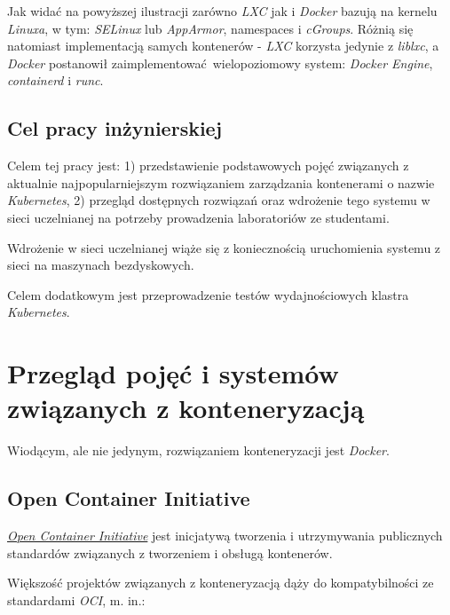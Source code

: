 \documentclass[a4paper,12pt,twoside,openany]{report}
\begin{document}
Jak widać na powyższej ilustracji zarówno \emph{LXC} jak i \emph{Docker}
bazują na kernelu \emph{Linuxa}, w tym: \emph{SELinux} lub
\emph{AppArmor}, namespaces i \emph{cGroups}. Różnią się natomiast
implementacją samych kontenerów - \emph{LXC} korzysta jedynie z
\emph{liblxc}, a \emph{Docker} postanowił zaimplementować~wielopoziomowy
system: \emph{Docker Engine}, \emph{containerd} i \emph{runc}.

\hypertarget{cel-pracy-inux17cynierskiej}{%
\section{Cel pracy inżynierskiej}\label{cel-pracy-inux17cynierskiej}}

Celem tej pracy jest: 1) przedstawienie podstawowych pojęć związanych z
aktualnie najpopularniejszym rozwiązaniem zarządzania kontenerami o
nazwie \emph{Kubernetes}, 2) przegląd dostępnych rozwiązań oraz
wdrożenie tego systemu w sieci uczelnianej na potrzeby prowadzenia
laboratoriów ze studentami.

Wdrożenie w sieci uczelnianej wiąże się z koniecznością uruchomienia
systemu z sieci na maszynach bezdyskowych.

Celem dodatkowym jest przeprowadzenie testów wydajnościowych klastra
\emph{Kubernetes}.

\hypertarget{przeglux105d-pojux119ux107-i-systemuxf3w-zwiux105zanych-z-konteneryzacjux105}{%
\chapter{Przegląd pojęć i systemów związanych z
konteneryzacją}\label{przeglux105d-pojux119ux107-i-systemuxf3w-zwiux105zanych-z-konteneryzacjux105}}

Wiodącym, ale nie jedynym, rozwiązaniem konteneryzacji jest
\emph{Docker}.

\hypertarget{open-container-initiative}{%
\section{Open Container Initiative}\label{open-container-initiative}}

\href{https://www.opencontainers.org/about}{\emph{Open Container
Initiative}} jest inicjatywą tworzenia i utrzymywania publicznych
standardów związanych z tworzeniem i obsługą kontenerów.

Większość projektów związanych z konteneryzacją dąży do kompatybilności
ze standardami \emph{OCI}, m. in.:
\end{document}
